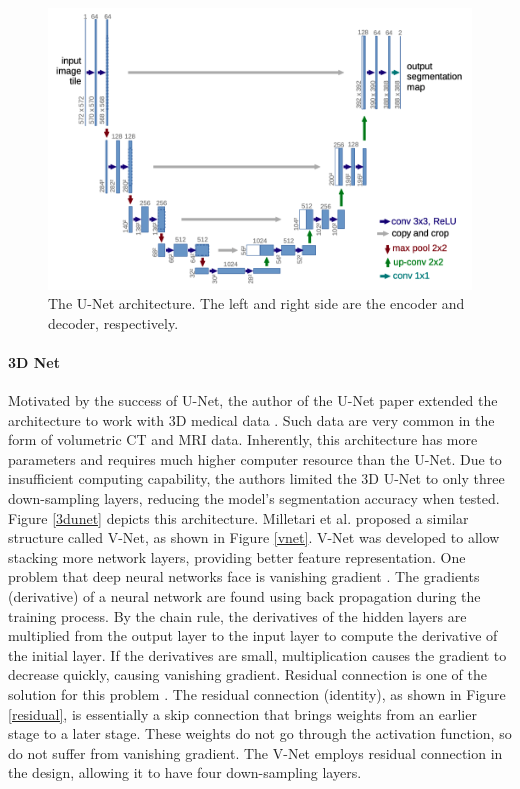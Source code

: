 \documentclass [11pt, proquest] {uwthesis}[2020/02/24]
\begin{document}
\begin{figure}
  \centering
  \includegraphics[width=0.8\linewidth]{figures/unet.png}
  \caption{The U-Net architecture. The left and right side are the encoder and decoder, respectively\cite{navab_u-net_2015}.}
  \label{unet}
\end{figure}

\paragraph{3D Net}

Motivated by the success of U-Net, the author of the U-Net paper extended the 
architecture to work with 3D medical data \cite{cicek_3d_2016}. Such data are 
very common in the form of volumetric CT and MRI data. Inherently, this architecture 
has more parameters and requires much higher computer resource than the U-Net. Due 
to insufficient computing capability, the authors limited the 3D U-Net to only 
three down-sampling layers, reducing the model’s segmentation accuracy when tested. 
Figure \ref{3dunet} depicts this architecture. Milletari et al. proposed a similar 
structure called V-Net, \cite{milletari_v-net_2016} as shown in Figure \ref{vnet}. 
V-Net was developed to allow stacking more network layers, providing better feature 
representation. One problem that deep neural networks face is vanishing gradient 
\cite{he_deep_2015}. The gradients (derivative) of a neural network are found using 
back propagation during the training process. By the chain rule, the derivatives of 
the hidden layers are multiplied from the output layer to the input layer to compute 
the derivative of the initial layer. If the derivatives are small, multiplication 
causes the gradient to decrease quickly, causing vanishing gradient. Residual connection 
is one of the solution for this problem \cite{he_deep_2015}. The residual connection 
(identity), as shown in Figure \ref{residual}, is essentially a skip connection that 
brings weights from an earlier stage to a later stage. These weights do not go through 
the activation function, so do not suffer from vanishing gradient. The V-Net employs 
residual connection in the design, allowing it to have four down-sampling layers.
\end{document}
